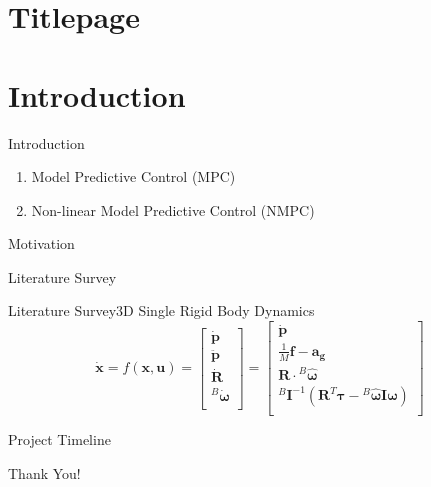 \documentclass{beamer}
\begin{document}
\section*{Titlepage}
\begin{frame}\titlepage\end{frame}

\section{Introduction}
\begin{frame}{Introduction}
    \begin{enumerate}
        \item Model Predictive Control (MPC)
        \item Non-linear Model Predictive Control (NMPC)
    \end{enumerate}
\end{frame}\normalfont

\begin{frame}{Motivation}

\end{frame}

\begin{frame}{Literature Survey}

\end{frame}

\begin{frame}{Literature Survey}{3D Single Rigid Body Dynamics}
    \[
        \dot{\mathbf{x}} = f(\mathbf{x}, \mathbf{u})
        = \begin{bmatrix}
            \dot{\mathbf{p}}                \\
            \ddot{\mathbf{p}}               \\
            \dot{\mathbf{R}}                \\
            {}^{B}\dot{\boldsymbol{\omega}} \\
        \end{bmatrix}
        = \begin{bmatrix}
            \dot{\mathbf{p}}                                                                                                     \\
            \frac{1}{M}\mathbf{f} - \mathbf{a_g}                                                                                 \\
            \mathbf{R} \cdot {}^{B}\boldsymbol{\hat{\omega}}                                                                     \\
            {}^{B}\mathbf{I}^{-1}(\mathbf{R}^T\boldsymbol{\tau} -  {}^{B}\boldsymbol{\hat{\omega}}\mathbf{I}\boldsymbol{\omega}) \\
        \end{bmatrix}
    \]
\end{frame}

\begin{frame}{Project Timeline}

\end{frame}

\begin{frame}
    \LARGE{Thank You!}
\end{frame}
\end{document}
